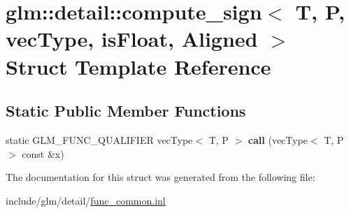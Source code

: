 \hypertarget{structglm_1_1detail_1_1compute__sign}{}\section{glm\+:\+:detail\+:\+:compute\+\_\+sign$<$ T, P, vec\+Type, is\+Float, Aligned $>$ Struct Template Reference}
\label{structglm_1_1detail_1_1compute__sign}
\subsection*{Static Public Member Functions}
\begin{DoxyCompactItemize}
\item 
\mbox{\label{structglm_1_1detail_1_1compute__sign_a7025aafb1ca04169c5a0930e61a5cdbf}} 
static G\+L\+M\+\_\+\+F\+U\+N\+C\+\_\+\+Q\+U\+A\+L\+I\+F\+I\+ER vec\+Type$<$ T, P $>$ {\bfseries call} (vec\+Type$<$ T, P $>$ const \&x)
\end{DoxyCompactItemize}


The documentation for this struct was generated from the following file\+:\begin{DoxyCompactItemize}
\item 
include/glm/detail/\hyperlink{func__common_8inl}{func\+\_\+common.\+inl}\end{DoxyCompactItemize}
